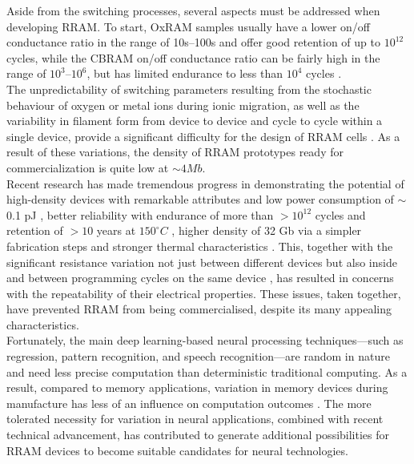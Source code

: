 \noindent Aside from the switching processes, several aspects must be addressed when developing RRAM. To start, OxRAM samples usually have a lower on/off conductance ratio in the range of 10s–100s and offer good retention of up to $10^{12}$ cycles\cite{ielmini2010resistance}, while the CBRAM on/off conductance ratio can be fairly high in the range of $10^3$–$10^6$, but has limited endurance to less than $10^4$ cycles \cite{ambrogio2014statistical1}. \\

\noindent The unpredictability of switching parameters resulting from the stochastic behaviour of oxygen or metal ions during ionic migration, as well as the variability in filament form from device to device and cycle to cycle within a single device, provide a significant difficulty for the design of RRAM cells \cite{ambrogio2014statistical2}. As a result of these variations, the density of RRAM prototypes ready for commercialization is quite low at $\sim 4 Mb$. \\

\noindent Recent research has made tremendous progress in demonstrating the potential of high-density devices with remarkable attributes and low power consumption of $\sim$0.1 pJ \cite{yang2013memristive}, better reliability with endurance of more than $>10^{12}$ cycles and retention of $>10$ years at $150^{\circ}C$ \cite{hu2014review}, higher density of 32 Gb via a simpler fabrication steps and stronger thermal characteristics \cite{cha2013nanoscale}. This, together with the significant resistance variation not just between different devices but also inside and between programming cycles on the same device \cite{moore2006lithography}, has resulted in concerns with the repeatability of their electrical properties. These issues, taken together, have prevented RRAM from being commercialised, despite its many appealing characteristics. \\

\noindent Fortunately, the main deep learning-based neural processing techniques—such as regression, pattern recognition, and speech recognition—are random in nature and need less precise computation than deterministic traditional computing. As a result, compared to memory applications, variation in memory devices during manufacture has less of an influence on computation outcomes \cite{malik2013governing}. The more tolerated necessity for variation in neural applications, combined with recent technical advancement, has contributed to generate additional possibilities for RRAM devices to become suitable candidates for neural technologies.